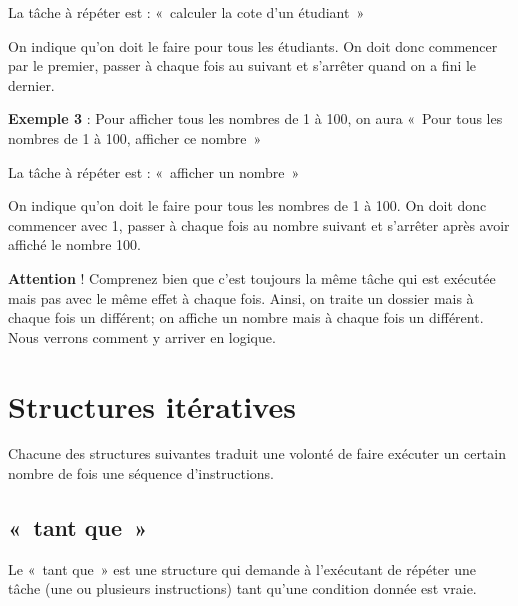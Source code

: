 	\begin{liste}
	\item 
		La tâche à répéter est : «~calculer la cote d'un
		étudiant~»
	\item 
		On indique qu'on doit le faire pour tous les étudiants.
		On doit donc commencer par le premier, passer à chaque fois au suivant
		et s'arrêter quand on a fini le dernier.
	\end{liste}

	\textbf{Exemple 3} : Pour afficher tous les nombres de 1 à 100, on aura
	«~Pour tous les nombres de 1 à 100, afficher ce nombre~»

	\begin{liste}
	\item
		La tâche à répéter est : «~afficher un nombre~»
	\item 
		On indique qu'on doit le faire pour tous les nombres de
		1 à 100. On doit donc commencer avec 1, passer à chaque fois au nombre
		suivant et s'arrêter après avoir affiché le nombre
		100.
	\end{liste}

	\textbf{Attention} ! Comprenez bien que c'est toujours
	la même tâche qui est exécutée mais pas avec le même effet à chaque
	fois. Ainsi, on traite un dossier mais à chaque fois un différent; on
	affiche un nombre mais à chaque fois un différent. Nous verrons comment
	y arriver en logique.

\section{Structures itératives}

	Chacune des structures suivantes traduit une volonté de faire exécuter
	un certain nombre de fois une séquence d’instructions. 

	\subsection{«~tant que~»}

		Le «~tant que~» est une structure qui demande à
		l'exécutant de répéter une tâche (une ou plusieurs
		instructions) tant qu'une condition donnée est vraie.


